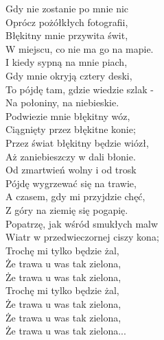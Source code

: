 
Gdy nie zostanie po mnie nic   \tab{}\\
Oprócz pożółkłych fotografii,  \tab{} \\
Błękitny mnie przywita świt,  \tab{}  \\
W miejscu, co nie ma go na mapie.   \\
\hops
I kiedy sypną na mnie piach, \\
Gdy mnie okryją cztery deski, \\
To pójdę tam, gdzie wiedzie szlak - \\
Na połoniny, na niebieskie. \\
\hops
Podwiezie mnie błękitny wóz, \\
Ciągnięty przez błękitne konie; \\
Przez świat błękitny będzie wiózł, \\
Aż zaniebieszczy w dali błonie. \\
\hops
Od zmartwień wolny i od trosk \\
Pójdę wygrzewać się na trawie, \\
A czasem, gdy mi przyjdzie chęć, \\
Z góry na ziemię się pogapię. \\
\hops
Popatrzę, jak wśród smukłych malw \\
Wiatr w przedwieczornej ciszy kona; \\
Trochę mi tylko będzie żal, \\
Że trawa u was tak zielona, \\
Że trawa u was tak zielona, \\
\hop
Trochę mi tylko będzie żal, \\
Że trawa u was tak zielona, \\
Że trawa u was tak zielona, \\
Że trawa u was tak zielona...